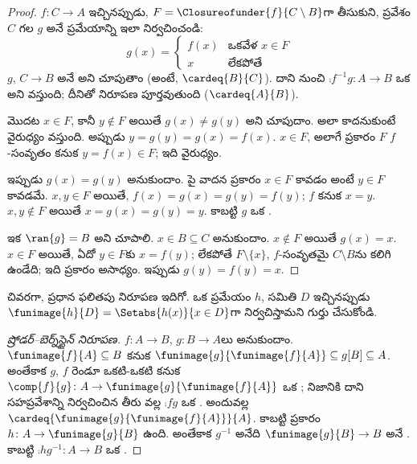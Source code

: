 \documentclass[../../../include/open-logic-section]{subfiles}
\begin{document}
\begin{proof}
 $f \colon C \to A$ ఇచ్చినప్పుడు,
$F = \Closureofunder{f}{C \setminus B}$గా తీసుకుని, ప్రవేశం $C$ గల
$g$ అనే ప్రమేయాన్ని ఇలా నిర్వచించండి:
\[
	g(x) =
	\begin{cases}
			f(x) &\text{ఒకవేళ $x \in F$}\\
			x & \text{లేకపోతే}
		\end{cases}
\]
$g$, $C \to B$ అనే  అని చూపుతాం (అంటే,
$\cardeq{B}{C}$). దాని నుంచి
$\comp{f^{-1}}{g} \colon A \to B$ ఒక  అని వస్తుంది;
దీనితో నిరూపణ పూర్తవుతుంది ($\cardeq{A}{B}$).

మొదట $x \in F$, కానీ $y\notin F$ అయితే $g(x) \neq g(y)$ అని
చూపుదాం. అలా కాదనుకుంటే వైరుధ్యం వస్తుంది. అప్పుడు
$y = g(y) = g(x) = f(x)$. $x \in F$, అలాగే
 ప్రకారం $F$ $f$-సంవృతం కనుక
$y = f(x) \in F$; ఇది వైరుధ్యం.

ఇప్పుడు $g(x) = g(y)$ అనుకుందాం. పై వాదన ప్రకారం $x \in F$ కావడం
అంటే $y \in F$ కావడమే. $x, y \in F$ అయితే,
$f(x) = g (x) = g(y) = f(y)$; $f$  కనుక $x = y$.
$x, y \notin F$ అయితే $x = g(x) = g(y) = y$. కాబట్టి $g$ ఒక
.

ఇక $\ran{g} = B$ అని చూపాలి. $x \in B \subseteq C$ అనుకుందాం. $x \notin F$ అయితే
$g(x) = x$. $x \in F$ అయితే, ఏదో $y \in F$కు $x = f(y)$;
లేకపోతే $F \setminus \{x\}$, $f$-సంవృతమై $C\setminus B$ను కలిగి
ఉండేది; ఇది  ప్రకారం అసాధ్యం. ఇప్పుడు
$g(y) = f(y) = x$.
\end{proof}

చివరగా, ప్రధాన ఫలితపు నిరూపణ ఇదిగో. ఒక ప్రమేయం $h$, సమితి $D$
ఇచ్చినప్పుడు $\funimage{h}{D} = \Setabs{h(x)}{x \in D}$గా
నిర్వచిస్తామని గుర్తు చేసుకోండి.

\begin{proof}[ష్రోడర్--బెర్న్‌స్టైన్ నిరూపణ]
$f \colon A \to B$, $g \colon B \to A$లు  అనుకుందాం.
$\funimage{f}{A} \subseteq B$ కనుక
$\funimage{g}{\funimage{f}{A}} \subseteq g[B] \subseteq A$.
అంతేకాక $g$, $f$ రెండూ ఒకటి-ఒకటి కనుక
$\comp{f}{g} \colon A \to \funimage{g}{\funimage{f}{A}}$ ఒక
; నిజానికి దాని సహప్రవేశాన్ని నిర్వచించిన తీరు వల్ల
$\comp{f}{g}$ ఒక . అందువల్ల
$\cardeq{\funimage{g}{\funimage{f}{A}}}{A}$. కాబట్టి
 ప్రకారం 
$h \colon A \to \funimage{g}{B}$ ఉంది. అంతేకాక $g^{-1}$ అనేది
$\funimage{g}{B} \to B$ అనే . కాబట్టి
$\comp{h}{g^{-1}} \colon A \to B$ ఒక .
\end{proof}
\end{document}
